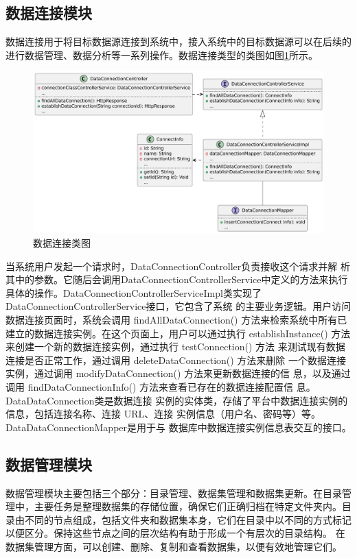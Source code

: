 \subsection{数据连接模块}
数据连接用于将目标数据源连接到系统中，接入系统中的目标数据源可以在后续的进行数据管理、数据分析等一系列操作。数据连接类型的类图如图\ref{fig:dataconneclass}所示。
\begin{figure}[H]
    \centering
    \includegraphics[width=.9\linewidth]{figure/数据连接类图.pdf}
    \caption{数据连接类图}
    \label{fig:dataconneclass}
\end{figure}
当系统用户发起一个请求时，DataConnectionController负责接收这个请求并解
析其中的参数。它随后会调用DataConnectionControllerService中定义的方法来执行具体的操作。DataConnectionControllerServiceImpl类实现了DataConnectionControllerService接口，它包含了系统
的主要业务逻辑。用户访问数据连接页面时，系统会调用 findAllDataConnection()
方法来检索系统中所有已建立的数据连接实例。在这个页面上，用户可以通过执行
establishInstance() 方法来创建一个新的数据连接实例，通过执行 testConnection() 方法
来测试现有数据连接是否正常工作，通过调用 deleteDataConnection() 方法来删除
一个数据连接实例，通过调用 modifyDataConnection() 方法来更新数据连接的信
息，以及通过调用 findDataConnectionInfo() 方法来查看已存在的数据连接配置信
息。DataDataConnection类是数据连接
实例的实体类，存储了平台中数据连接实例的信息，包括连接名称、连接 URL、连接
实例信息（用户名、密码等）等。DataDataConnectionMapper是用于与
数据库中数据连接实例信息表交互的接口。
\subsection{数据管理模块}
数据管理模块主要包括三个部分：目录管理、数据集管理和数据集更新。在目录管理中，主要任务是整理数据集的存储位置，确保它们正确归档在特定文件夹内。目录由不同的节点组成，包括文件夹和数据集本身，它们在目录中以不同的方式标记以便区分。保持这些节点之间的层次结构有助于形成一个有层次的目录结构。
在数据集管理方面，可以创建、删除、复制和查看数据集，以便有效地管理它们。


